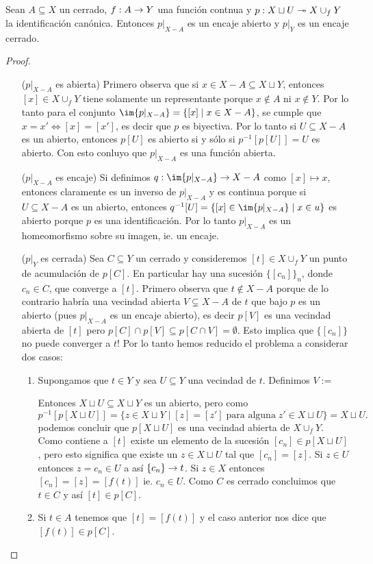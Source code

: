 \begin{ejercicio}\label{ej:81}
  Sean $A\subseteq X$ un cerrado, $f:A\rightarrow Y$ una funci\'on contnua y
  $p:X\sqcup U\twoheadrightarrow X\cup_f Y$ la identificaci\'on can\'onica. Entonces $p|_{X-A}$ es
  un encaje abierto y $p|_Y$ es un encaje cerrado.
\end{ejercicio}
\begin{proof}$\;$\\%
  \begin{enumerate}
   \item[($p|_{X-A}$ es abierta)]
  Primero observa que si $x\in X-A\subseteq X\sqcup Y$, entonces $[x]\in X\cup_f Y$
  tiene solamente un representante porque $x\not\in A$ ni $x\not\in Y$. Por lo tanto
  para el conjunto $\im{p|_{X-A}}=\{[x]\mid x\in X-A\}$, se cumple que $x=x'\iff[x]=[x']$,
  es decir que $p$ es biyectiva. Por lo tanto si $U\subseteq X-A$ es un abierto, entonces
  $p[U]$ es abierto si y s\'olo si $p^{-1}[p[U]]=U$ es abierto. Con esto conluyo que $p|_{X-A}$
  es una funci\'on abierta.
  
  \item[($p|_{X-A}$ es encaje)]
  Si definimos $q:\im{p|_{X-A}}\ra X-A$ como $[x]\mapsto x$, entonces claramente
  es un inverso de $p|_{X-A}$ y es continua porque si $U\subseteq X-A$ es un abierto,
  entonces $q^{-1}[U]=\{[x]\in\im{p|_{X-A}}\mid x\in u\}$ es abierto porque $p$ es
  una identificaci\'on. Por lo tanto $p|_{X-A}$ es un homeomorfismo sobre su imagen, ie.
  un encaje.

  \item[($p|_Y$ es cerrada)]
  Sea $C\subseteq Y$ un cerrado y consideremos $[t]\in X\cup_f Y$ un punto de
  acumulaci\'on de $p[C]$. En particular hay una sucesi\'on $\{[c_n]\}_{n}$,
  donde $c_n\in C$, que converge a $[t]$. Primero observa que $t\not\in X-A$
  porque de lo contrario habr\'ia una vecindad abierta $V\subsetneq X-A$ de $t$
  que bajo $p$ es un abierto (pues $p|_{X-A}$ es un encaje abierto), es decir
  $p[V]$ es una vecindad abierta de $[t]$ pero $p[C]\cap p[V]\subseteq p[C\cap V]=\emptyset$.
  Esto implica que $\{[c_n]\}$ no puede converger a $t$! Por lo tanto hemos
  reducido el problema a considerar dos casos:
  \begin{enumerate}
  \item Supongamos que $t\in Y$ y sea $U\subseteq Y$ una vecindad de $t$. Definimos
    $V:=$



    Entonces
    $X\sqcup U\subseteq X\sqcup Y$ es un abierto, pero como
    \[
      p^{-1}[p[X\sqcup U]]=
      \{z\in X\sqcup Y \mid [z]=[z']\;\text{para alguna}\; z'\in X\sqcup U\} = X\sqcup U.
    \]
    podemos concluir que $p[X\sqcup U]$ es una vecindad abierta de $X\cup_f Y$. Como
    contiene a $[t]$ existe un elemento de la sucesi\'on $[c_n]\in p[X\sqcup U]$, pero
    esto significa que existe un $z\in X\sqcup U$ tal que $[c_n]=[z]$. Si $z\in U$ entonces
    $z=c_n\in U$ a as\'i $\{c_n\}\rightarrow t$. Si $z\in X$ entonces $[c_n]=[z]=[f(t)]$
    ie. $c_n\in U$. Como $C$ es cerrado concluimos que $t\in C$ y as\'i $[t]\in p[C]$.
  \item Si $t\in A$ tenemos que $[t]=[f(t)]$ y el caso anterior nos dice que $[f(t)]\in p[C]$.
    

\end{enumerate}
\end{enumerate}
\end{proof}
